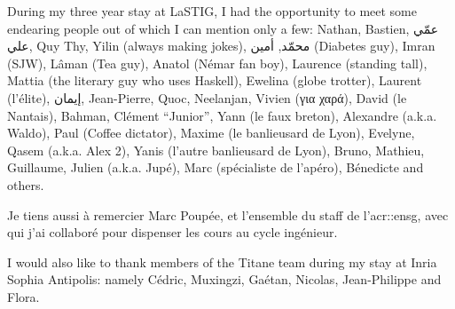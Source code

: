 During my three year stay at LaSTIG, I had the opportunity to meet some endearing people out of which I can mention only a few: Nathan, Bastien, \foreignlanguage{arabic}{عمّي علي}, Quy Thy, Yilin (always making jokes), \foreignlanguage{arabic}{محمّد}, \foreignlanguage{arabic}{أمين} (Diabetes guy), Imran (SJW), Lâman (Tea guy), Anatol (Némar fan boy), Laurence (standing tall), Mattia (the literary guy who uses Haskell), Ewelina (globe trotter), Laurent (l'élite), \foreignlanguage{arabic}{إيمان}, Jean-Pierre, Quoc, Neelanjan, Vivien (\foreignlanguage{greek}{για χαρά}), David (le Nantais), Bahman, Clément ``Junior'', Yann (le faux breton), Alexandre (a.k.a. Waldo), Paul (Coffee dictator), Maxime (le banlieusard de Lyon), Evelyne, Qasem (a.k.a. Alex 2), Yanis (l'autre banlieusard de Lyon), Bruno, Mathieu, Guillaume, Julien (a.k.a. Jupé), Marc (spécialiste de l'apéro), Bénedicte and others.

Je tiens aussi à remercier Marc Poupée, et l'ensemble du staff de l'\acrshort*{acr::ensg}, avec qui j'ai collaboré pour dispenser les cours au cycle ingénieur.

I would also like to thank members of the Titane team during my stay at Inria Sophia Antipolis: namely Cédric, Muxingzi, Gaétan, Nicolas, Jean-Philippe and Flora.


